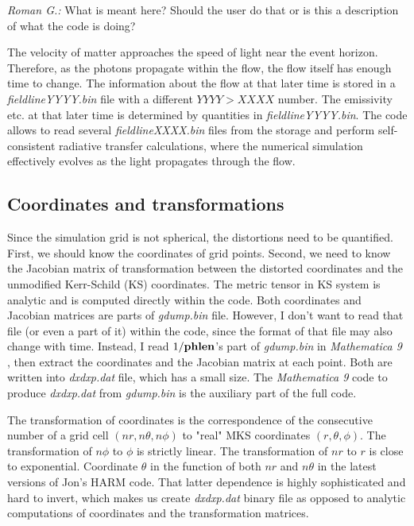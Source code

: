 \documentclass{emulateapj}
\newcommand{\mat}{\textit{Mathematica 9 }}
\newcommand{\rg}[1]{\color{blue}\textit{Roman G.:} #1\color{black}}
\begin{document}
\rg{What is meant here? Should the user do that or is this a
  description of what the code is doing?}

The velocity of matter approaches the speed of light near the event horizon. Therefore, as the photons propagate within the flow, the flow itself has enough time to change.
The information about the flow at that later time is stored in a \textit{fieldlineYYYY.bin} file with a different $YYYY>XXXX$ number. The emissivity etc.
at that later time is determined by quantities in \textit{fieldlineYYYY.bin}. The code allows to read several \textit{fieldlineXXXX.bin} files from the storage
and perform self-consistent radiative transfer calculations, where the numerical simulation effectively evolves as the light propagates through the flow.

\subsection{Coordinates and transformations}
Since the simulation grid is not spherical, the distortions need to be quantified.
First, we should know the coordinates of grid points. Second, we need to know the Jacobian matrix of transformation between the distorted coordinates and
the unmodified Kerr-Schild (KS) coordinates. The metric tensor in KS system is analytic and is computed directly within the code.
Both coordinates and Jacobian matrices are parts of \textit{gdump.bin} file. However, I don't want to read that file (or even a part of it) within the code,
since the format of that file may also change with time. Instead, I read $1/{\bf phlen}$'s part of \textit{gdump.bin} in \mat, 
then extract the coordinates and the Jacobian matrix at each point. Both are written into \textit{dxdxp.dat} file, which has a small size.
The \mat code to produce \textit{dxdxp.dat} from \textit{gdump.bin} is the auxiliary part of the full code.

The transformation of coordinates is the correspondence of the consecutive number of a grid cell $(nr,n\theta,n\phi)$ to "real" MKS coordinates $(r,\theta,\phi)$.
The transformation of $n\phi$ to $\phi$ is strictly linear. The transformation of $nr$ to $r$ is close to exponential.
Coordinate $\theta$ in the function of both $nr$ and $n\theta$ in the latest versions of Jon's HARM code.
That latter dependence is highly sophisticated and hard to invert, which makes us create \textit{dxdxp.dat} binary file as opposed to analytic computations of coordinates
and the transformation matrices.
\end{document}

